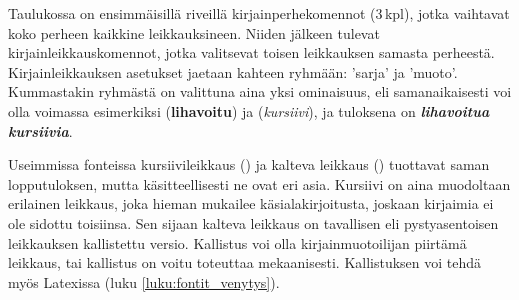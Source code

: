 
Taulukossa on ensimmäisillä riveillä kirjainperhekomennot (3\,kpl),
jotka vaihtavat koko perheen kaikkine leikkauksineen. Niiden jälkeen
tulevat kirjainleikkauskomennot, jotka valitsevat toisen leikkauksen
samasta perheestä. Kirjainleikkauksen asetukset jaetaan kahteen ryhmään:
 'sarja' ja  'muoto'.
Kummastakin ryhmästä on valittuna aina yksi ominaisuus, eli
samanaikaisesti voi olla voimassa esimerkiksi 
(\textbf{lihavoitu}) ja  (\textit{kursiivi}), ja
tuloksena on \textbf{\itshape lihavoitua kursiivia}.

Useimmissa fonteissa kursiivileikkaus () ja
kalteva leikkaus () tuottavat saman
lopputuloksen, mutta käsitteellisesti ne ovat eri asia. Kursiivi on aina
muodoltaan erilainen leikkaus, joka hieman mukailee
käsi\-ala\-kir\-joi\-tusta, joskaan kirjaimia ei ole sidottu toisiinsa.
Sen sijaan kalteva leikkaus on tavallisen eli pys\-ty\-asen\-toi\-sen
leikkauksen kallistettu versio. Kallistus voi olla kirjainmuotoilijan
piirtämä leikkaus, tai kallistus on voitu toteuttaa mekaanisesti.
Kallistuksen voi tehdä myös Latexissa (luku \ref{luku:fontit_venytys}).

